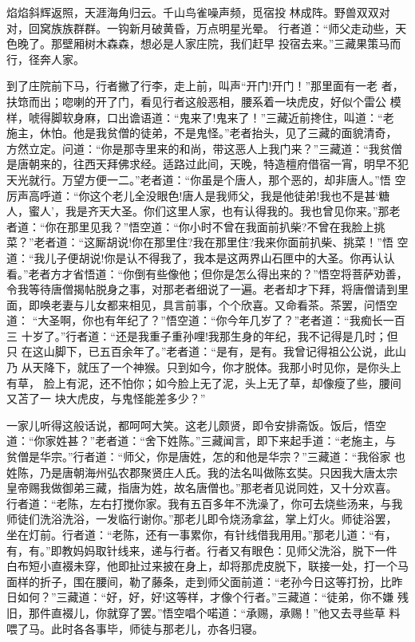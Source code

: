 焰焰斜辉返照，天涯海角归云。千山鸟雀噪声频，觅宿投
林成阵。野兽双双对对，回窝族族群群。一钩新月破黄昏，万点明星光晕。
行者道：“师父走动些，天色晚了。那壁厢树木森森，想必是人家庄院，我们赶早
投宿去来。”三藏果策马而行，径奔人家。

到了庄院前下马，行者撇了行李，走上前，叫声“开门!开门！”那里面有一老
者，扶筇而出；唿喇的开了门，看见行者这般恶相，腰系着一块虎皮，好似个雷公
模样，唬得脚软身麻，口出谵语道：“鬼来了!鬼来了！”三藏近前搀住，叫道：“老
施主，休怕。他是我贫僧的徒弟，不是鬼怪。”老者抬头，见了三藏的面貌清奇，
方然立定。问道：“你是那寺里来的和尚，带这恶人上我门来？”三藏道：“我贫僧
是唐朝来的，往西天拜佛求经。适路过此间，天晚，特造檀府借宿一宵，明早不犯
天光就行。万望方便一二。”老者道：“你虽是个唐人，那个恶的，却非唐人。”悟
空厉声高呼道：“你这个老儿全没眼色!唐人是我师父，我是他徒弟!我也不是甚‘糖
人，蜜人’，我是齐天大圣。你们这里人家，也有认得我的。我也曾见你来。”那老
者道：“你在那里见我？”悟空道：“你小时不曾在我面前扒柴?不曾在我脸上挑
菜？”老者道：“这厮胡说!你在那里住?我在那里住?我来你面前扒柴、挑菜！”悟
空道：“我儿子便胡说!你是认不得我了，我本是这两界山石匣中的大圣。你再认认
看。”老者方才省悟道：“你倒有些像他；但你是怎么得出来的？”悟空将菩萨劝善，
令我等待唐僧揭帖脱身之事，对那老者细说了一遍。老者却才下拜，将唐僧请到里
面，即唤老妻与儿女都来相见，具言前事，个个欣喜。又命看茶。茶罢，问悟空道：
“大圣啊，你也有年纪了？”悟空道：“你今年几岁了？”老者道：“我痴长一百三
十岁了。”行者道：“还是我重子重孙哩!我那生身的年纪，我不记得是几时；但只
在这山脚下，已五百余年了。”老者道：“是有，是有。我曾记得祖公公说，此山乃
从天降下，就压了一个神猴。只到如今，你才脱体。我那小时见你，是你头上有草，
脸上有泥，还不怕你；如今脸上无了泥，头上无了草，却像瘦了些，腰间又苫了一
块大虎皮，与鬼怪能差多少？”

一家儿听得这般话说，都呵呵大笑。这老儿颇贤，即令安排斋饭。饭后，悟空
道：“你家姓甚？”老者道：“舍下姓陈。”三藏闻言，即下来起手道：“老施主，与
贫僧是华宗。”行者道：“师父，你是唐姓，怎的和他是华宗？”三藏道：“我俗家
也姓陈，乃是唐朝海州弘农郡聚贤庄人氏。我的法名叫做陈玄奘。只因我大唐太宗
皇帝赐我做御弟三藏，指唐为姓，故名唐僧也。”那老者见说同姓，又十分欢喜。
行者道：“老陈，左右打搅你家。我有五百多年不洗澡了，你可去烧些汤来，与我
师徒们洗浴洗浴，一发临行谢你。”那老儿即令烧汤拿盆，掌上灯火。师徒浴罢，
坐在灯前。行者道：“老陈，还有一事累你，有针线借我用用。”那老儿道：“有，
有，有。”即教妈妈取针线来，递与行者。行者又有眼色：见师父洗浴，脱下一件
白布短小直裰未穿，他即扯过来披在身上，却将那虎皮脱下，联接一处，打一个马
面样的折子，围在腰间，勒了藤条，走到师父面前道：“老孙今日这等打扮，比昨
日如何？”三藏道：“好，好，好!这等样，才像个行者。”三藏道：“徒弟，你不嫌
残旧，那件直裰儿，你就穿了罢。”悟空唱个喏道：“承赐，承赐！”他又去寻些草
料喂了马。此时各各事毕，师徒与那老儿，亦各归寝。

